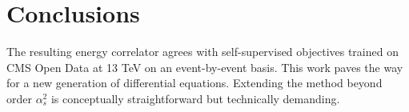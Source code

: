 \section{Conclusions}\label{sec:conclusions}

The resulting energy correlator agrees with self-supervised objectives
trained on CMS Open Data at 13 TeV on an event-by-event basis. This work
paves the way for a new generation of differential equations. Extending
the method beyond order $\alpha_s^2$ is conceptually straightforward but
technically demanding.

